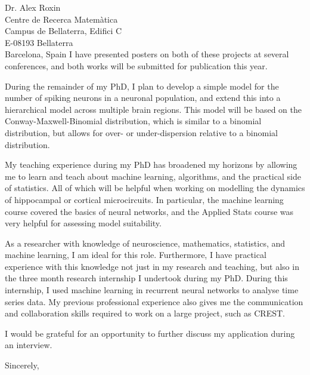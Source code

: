\documentclass[11pt]{letter} %
\begin{document}
\begin{letter}{Dr. Alex Roxin \\ 
  Centre de Recerca Matem\`{a}tica \\ 
  Campus de Bellaterra, Edifici C \\
  E-08193 Bellaterra \\
  Barcelona, Spain}
  I have presented posters on both of these projects at several conferences, and both works will be submitted for publication this year. 

  During the remainder of my PhD, I plan to develop a simple model for the number of spiking neurons in a neuronal population, and extend this into a hierarchical model across multiple brain regions. This model will be based on the Conway-Maxwell-Binomial distribution, which is similar to a binomial distribution, but allows for over- or under-dispersion relative to a binomial distribution. 

  My teaching experience during my PhD has broadened my horizons by allowing me to learn and teach about machine learning, algorithms, and the practical side of statistics. All of which will be helpful when working on modelling the dynamics of hippocampal or cortical microcircuits. In particular, the machine learning course covered the basics of neural networks, and the Applied Stats course was very helpful for assessing model suitability.

  As a researcher with knowledge of neuroscience, mathematics, statistics, and machine learning, I am ideal for this role. Furthermore, I have practical experience with this knowledge not just in my research and teaching, but also in the three month research internship I undertook during my PhD. During this internship, I used machine learning in recurrent neural networks to analyse time series data. My previous professional experience also gives me the communication and collaboration skills required to work on a large project, such as CREST. 

  I would be grateful for an opportunity to further discuss my application during an interview.

  \vspace{2\parskip} %
  \closing{Sincerely,}
  \vspace{2\parskip} %




\end{letter}
 
\end{document}

